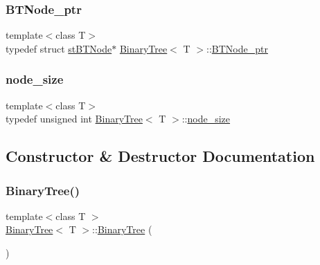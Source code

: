 \mbox{\label{class_binary_tree_a35ef67d8ee2843144c5c309c5a6ecd5b}} 
\subsubsection{\texorpdfstring{B\+T\+Node\+\_\+ptr}{BTNode\_ptr}}
{\footnotesize\ttfamily template$<$class T$>$ \\
typedef struct \hyperlink{struct_binary_tree_1_1st_b_t_node}{st\+B\+T\+Node}$\ast$ \hyperlink{class_binary_tree}{Binary\+Tree}$<$ T $>$\+::\hyperlink{class_binary_tree_a35ef67d8ee2843144c5c309c5a6ecd5b}{B\+T\+Node\+\_\+ptr}}

\mbox{\label{class_binary_tree_a6c9d1d57bf13ca658fe926a0c7255ecf}} 
\subsubsection{\texorpdfstring{node\+\_\+size}{node\_size}}
{\footnotesize\ttfamily template$<$class T$>$ \\
typedef unsigned int \hyperlink{class_binary_tree}{Binary\+Tree}$<$ T $>$\+::\hyperlink{class_binary_tree_a6c9d1d57bf13ca658fe926a0c7255ecf}{node\+\_\+size}}



\subsection{Constructor \& Destructor Documentation}
\mbox{\label{class_binary_tree_a9202cce23960faf8f647c6765decccd4}} 
\subsubsection{\texorpdfstring{Binary\+Tree()}{BinaryTree()}}
{\footnotesize\ttfamily template$<$class T $>$ \\
\hyperlink{class_binary_tree}{Binary\+Tree}$<$ T $>$\+::\hyperlink{class_binary_tree}{Binary\+Tree} (\begin{DoxyParamCaption}{ }\end{DoxyParamCaption})}

